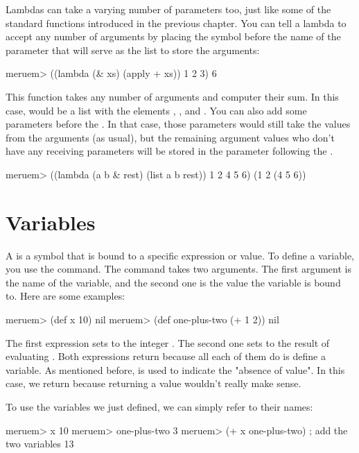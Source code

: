 Lambdas can take a varying number of parameters too, just like some of the standard functions introduced in the previous chapter. You can tell a lambda to accept any number of arguments by placing the \code{\&} symbol before the name of the parameter that will serve as the list to store the arguments:

\begin{REPL}
meruem> ((lambda (& xs) (apply + xs)) 1 2 3)
6
\end{REPL}

This function takes any number of arguments and computer their sum. In this case,  would be a list with the elements , , and . You can also add some parameters before the \code{\&}. In that case, those parameters would still take the values from the arguments (as usual), but the remaining argument values who don't have any receiving parameters will be stored in the parameter following the \code{\&}. 

\begin{REPL}
meruem> ((lambda (a b & rest) (list a b rest)) 1 2 4 5 6)
(1 2 (4 5 6))
\end{REPL}

\section{Variables}
A  is a symbol that is bound to a specific expression or value. To define a variable, you use the  command. The  command takes two arguments. The first argument is the name of the variable, and the second one is the value the variable is bound to. Here are some examples:

\begin{REPL}
meruem> (def x 10)
nil
meruem> (def one-plus-two (+ 1 2))
nil
\end{REPL}

The first expression sets  to the integer . The second one sets  to the result of evaluating . Both expressions return  because all each of them do is define a variable. As mentioned before,  is used to indicate the "absence of value". In this case, we return  because returning a value wouldn't really make sense. 

To use the variables we just defined, we can simply refer to their names:

\begin{REPL}
meruem> x
10
meruem> one-plus-two
3
meruem> (+ x one-plus-two)		; add the two variables
13
\end{REPL}

